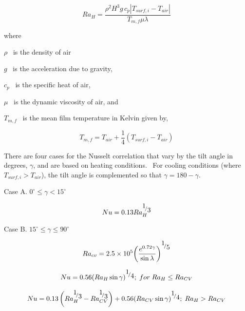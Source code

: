 \begin{equation}
R{a_H} = \frac{{{\rho ^2}{H^3}g\,{c_p}\left| {{T_{surf,i}} - {T_{air}}} \right|}}{{{T_{m,f}}\mu \lambda }}
\end{equation}

where

\(\rho\) ~is the density of air

\(g\) ~is the acceleration due to gravity,

\({c_p}\) ~is the specific heat of air,

\(\mu\) ~is the dynamic viscosity of air, and

\({T_{m,f}}\) ~is the mean film temperature in Kelvin given by,

\begin{equation}
{T_{m,f}} = {T_{air}} + \frac{1}{4}\left( {{T_{surf,i}} - {T_{air}}} \right)
\end{equation}

There are four cases for the Nusselt correlation that vary by the tilt angle in degrees, \(\gamma\), and are based on heating conditions.~ For cooling conditions (where \({T_{surf,i}} > {T_{air}}\)), the tilt angle is complemented so that \(\gamma = 180 - \gamma\).

Case A. \({0^\circ } \le \gamma < 15^\circ\)

\begin{equation}
Nu = 0.13Ra_H^{{\raise0.7ex\hbox{1} \!\mathord{\left/ {\vphantom {1 3}}\right.}\!\lower0.7ex\hbox{3}}}
\end{equation}

Case B. \(15^\circ \le \gamma \le 90^\circ\)

\begin{equation}
R{a_{cv}} = 2.5 \times {10^5}{\left( {\frac{{{e^{0.72\gamma }}}}{{\sin \lambda }}} \right)^{{\raise0.7ex\hbox{1} \!\mathord{\left/ {\vphantom {1 5}}\right.}\!\lower0.7ex\hbox{5}}}}
\end{equation}

\begin{equation}
Nu = 0.56{\left( {R{a_H}\sin \gamma } \right)^{{\raise0.7ex\hbox{1} \!\mathord{\left/ {\vphantom {1 4}}\right.}\!\lower0.7ex\hbox{4}}}};\;for\;R{a_H} \le R{a_{CV}}
\end{equation}

\begin{equation}
Nu = 0.13\left( {Ra_H^{{\raise0.7ex\hbox{1} \!\mathord{\left/ {\vphantom {1 3}}\right.}\!\lower0.7ex\hbox{3}}} - Ra_{CV}^{{\raise0.7ex\hbox{1} \!\mathord{\left/ {\vphantom {1 3}}\right.}\!\lower0.7ex\hbox{3}}}} \right) + 0.56{\left( {R{a_{CV}}\sin \gamma } \right)^{{\raise0.7ex\hbox{1} \!\mathord{\left/ {\vphantom {1 4}}\right.}\!\lower0.7ex\hbox{4}}}};\;R{a_H} > R{a_{CV}}
\end{equation}

